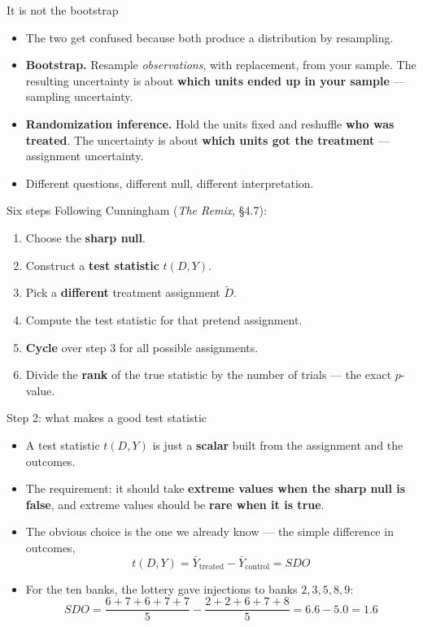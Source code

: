 \documentclass[
  11pt,
  ignorenonframetext,
  aspectratio=169,
]{beamer}
\providecommand{\tightlist}{%
  \setlength{\itemsep}{0pt}\setlength{\parskip}{0pt}}
\begin{document}
\begin{frame}{It is not the bootstrap}
\protect{}\label{it-is-not-the-bootstrap}
\begin{itemize}
\tightlist
\item
  The two get confused because both produce a distribution by
  resampling.
\item
  \textbf{Bootstrap.} Resample \emph{observations}, with replacement,
  from your sample. The resulting uncertainty is about \textbf{which
  units ended up in your sample} --- sampling uncertainty.
\item
  \textbf{Randomization inference.} Hold the units fixed and reshuffle
  \textbf{who was treated}. The uncertainty is about \textbf{which units
  got the treatment} --- assignment uncertainty.
\item
  Different questions, different null, different interpretation.
\end{itemize}
\end{frame}

\begin{frame}{Six steps}
\protect{}\label{six-steps}
Following Cunningham (\emph{The Remix}, §4.7):

\begin{enumerate}
\tightlist
\item
  Choose the \textbf{sharp null}.
\item
  Construct a \textbf{test statistic} \(t(D, Y)\).
\item
  Pick a \textbf{different} treatment assignment \(\tilde D\).
\item
  Compute the test statistic for that pretend assignment.
\item
  \textbf{Cycle} over step 3 for all possible assignments.
\item
  Divide the \textbf{rank} of the true statistic by the number of trials
  --- the exact \(p\)-value.
\end{enumerate}
\end{frame}

\begin{frame}{Step 2: what makes a good test statistic}
\protect{}\label{step-2-what-makes-a-good-test-statistic}
\begin{itemize}
\tightlist
\item
  A test statistic \(t(D, Y)\) is just a \textbf{scalar} built from the
  assignment and the outcomes.
\item
  The requirement: it should take \textbf{extreme values when the sharp
  null is false}, and extreme values should be \textbf{rare when it is
  true}.
\item
  The obvious choice is the one we already know --- the simple
  difference in outcomes, \[
  t(D, Y) = \bar{Y}_{\text{treated}} - \bar{Y}_{\text{control}} = SDO
  \]
\item
  For the ten banks, the lottery gave injections to banks
  \(2, 3, 5, 8, 9\): \[
  SDO = \frac{6+7+6+7+7}{5} - \frac{2+2+6+7+8}{5} = 6.6 - 5.0 = 1.6
  \]
\end{itemize}
\end{frame}
\end{document}
